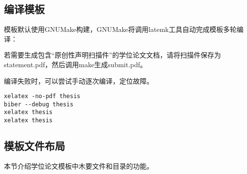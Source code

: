 \subsection{编译模板}
\label{sec:process}

模板默认使用GNUMake构建，GNUMake将调用latemk工具自动完成模板多轮编译：


若需要生成包含“原创性声明扫描件”的学位论文文档，请将扫描件保存为statement.pdf，然后调用make生成submit.pdf。


编译失败时，可以尝试手动逐次编译，定位故障。

\begin{lstlisting}[basicstyle=\small\ttfamily, caption={手动逐次编译}, numbers=none]
xelatex -no-pdf thesis
biber --debug thesis
xelatex thesis
xelatex thesis
\end{lstlisting}

\subsection{模板文件布局}
\label{sec:layout}


本节介绍学位论文模板中木要文件和目录的功能。

